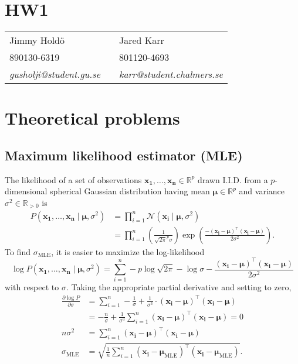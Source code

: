 \documentclass[a4paper,11pt]{article}
\DeclareMathOperator{\given}{\mid}
\begin{document}
\section*{HW1}

\begin{tabular*}{0.9\textwidth}{@{\extracolsep{\fill} } lll}
Jimmy Hold\"{o} & & Jared Karr\\
890130-6319 & & 801120-4693\\
\it{gusholji@student.gu.se} & & \it{karr@student.chalmers.se}\\
\end{tabular*}

\section{Theoretical problems}
\subsection{Maximum likelihood estimator (MLE)}
The likelihood of a set of observations $\mathbf{x_1},\dots,\mathbf{x_n}\in\mathbb{R}^p$ drawn I.I.D. from a $p$-dimensional spherical Gaussian distribution having mean $\boldsymbol\mu\in\mathbb{R}^p$ and variance $\sigma^2\in\mathbb{R}_{>0}$ is
\begin{align*}
  P(\mathbf{x_1},\dots,\mathbf{x_n}\given \boldsymbol\mu,\sigma^2)
    &=\prod_{i=1}^n\mathcal{N}(\mathbf{x_i}\given \boldsymbol\mu, \sigma^2)\\
    &=\prod_{i=1}^n\left(
        \frac{1}{\sqrt{2\pi}^p\sigma}
      \right)\exp\left(
        \frac{-(\mathbf{x_i}-\boldsymbol\mu)^\top(\mathbf{x_i}-\boldsymbol\mu)}
             {2\sigma^2}
      \right).
\end{align*}
To find $\sigma_\textrm{MLE}$, it is easier to maximize the log-likelihood
\begin{equation*}
  \log P(\mathbf{x_1},\dots,\mathbf{x_n}\given\boldsymbol\mu,\sigma^2)
    =\sum_{i=1}^n
      -p\log\sqrt{2\pi}
      -\log\sigma
      -\frac{(\mathbf{x_i}-\boldsymbol\mu)^\top(\mathbf{x_i}-\boldsymbol\mu)}{2\sigma^2} 
\end{equation*}
with respect to $\sigma$. Taking the appropriate partial derivative and setting to zero,
\begin{align*}
\frac{\partial\log P}{\partial\sigma}
  &=\sum_{i=1}^n
    -\frac{1}{\sigma}
    +\frac{1}{\sigma^3}\cdot(\mathbf{x_i}-\boldsymbol\mu)^\top(\mathbf{x_i}-\boldsymbol\mu)\\
  &=-\frac{n}{\sigma}
    +\frac{1}{\sigma^3}\sum_{i=1}^n(\mathbf{x_i}-\boldsymbol\mu)^\top(\mathbf{x_i}-\boldsymbol\mu)=0\\
n\sigma^2
  &=\sum_{i=1}^n(\mathbf{x_i}-\boldsymbol\mu)^\top(\mathbf{x_i}-\boldsymbol\mu)\\
\sigma_\textrm{MLE}&=\sqrt{\frac{1}{n}\sum_{i=1}^n(\mathbf{x_i}-\boldsymbol\mu_\textrm{MLE})^\top(\mathbf{x_i}-\boldsymbol\mu_\textrm{MLE})}.
\end{align*}
\end{document}

